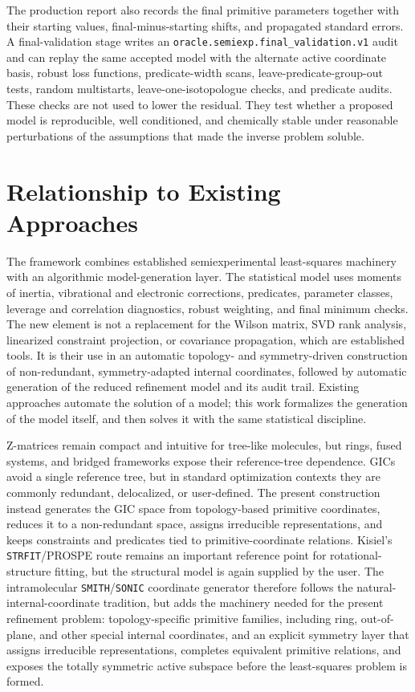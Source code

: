 \documentclass[aip,jcp,reprint,longbibliography,floatfix]{revtex4-2}
\begin{document}
The production report also records the final primitive parameters together
with their starting values, final-minus-starting shifts, and propagated
standard errors. A final-validation stage writes an
\texttt{oracle.semiexp.final\_validation.v1} audit and can replay the same
accepted model with the alternate active coordinate basis, robust loss
functions, predicate-width scans, leave-predicate-group-out tests, random
multistarts, leave-one-isotopologue checks, and predicate audits. These checks
are not used to lower the residual. They test whether a proposed model is
reproducible, well conditioned, and chemically stable under reasonable
perturbations of the assumptions that made the inverse problem soluble.


\section{Relationship to Existing Approaches}

The framework combines established semiexperimental least-squares
machinery\cite{Demaison2011EquilibriumStructures,Mendolicchio2017MSR,Bartell1975Predicate,Mendolicchio2025FastDvib}
with an algorithmic model-generation layer. The statistical model
uses moments of inertia, vibrational and electronic corrections, predicates,
parameter classes, leverage and correlation diagnostics, robust weighting, and
final minimum checks. The new element is not a replacement for the Wilson
matrix, SVD rank analysis, linearized constraint projection, or covariance
propagation, which are established tools. It is their use in an automatic
topology- and symmetry-driven construction of non-redundant, symmetry-adapted
internal coordinates, followed by automatic generation of the reduced
refinement model and its audit trail. Existing approaches automate the solution
of a model; this work formalizes the generation of the model itself, and then
solves it with the same statistical discipline.

Z-matrices remain compact and intuitive for tree-like molecules, but rings,
fused systems, and bridged frameworks expose their reference-tree
dependence.\cite{BakerHehre1991ZMatrix} GICs avoid a single reference tree, but
in standard optimization contexts they are commonly redundant, delocalized, or
user-defined. The present construction instead generates the GIC space from
topology-based primitive coordinates, reduces it to a non-redundant space,
assigns irreducible representations, and keeps constraints and predicates tied
to primitive-coordinate relations. Kisiel's \texttt{STRFIT}/PROSPE
route\cite{KisielPROSPE} remains an important reference point for
rotational-structure fitting, but the structural model is again supplied by
the user.\cite{Kanzow2025PCCP}
The intramolecular \texttt{SMITH}/\texttt{SONIC} coordinate generator therefore follows the
natural-internal-coordinate
tradition, but adds the machinery needed for the present refinement problem:
topology-specific primitive families, including ring, out-of-plane, and other
special internal coordinates, and an explicit symmetry layer that assigns
irreducible representations, completes equivalent primitive relations, and
exposes the totally symmetric active subspace before the least-squares problem
is formed.
\end{document}
